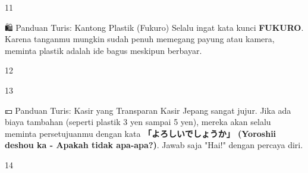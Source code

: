 \begin{convobox}{11}
    \noindent
     

    \vspace{1.5em}
\end{convobox}

\begin{lessonbox}{🛍️ Panduan Turis: Kantong Plastik (Fukuro)}
    Selalu ingat kata kunci \textbf{FUKURO}. Karena tanganmu mungkin sudah penuh memegang payung atau kamera, meminta plastik adalah ide bagus meskipun berbayar.
\end{lessonbox}

\begin{convobox}{12}
    \noindent
      

    \vspace{1.5em}
\end{convobox}

\begin{convobox}{13}
    \noindent

    \vspace{1.5em}
\end{convobox}

\begin{lessonbox}{💴 Panduan Turis: Kasir yang Transparan}
    Kasir Jepang sangat jujur. Jika ada biaya tambahan (seperti plastik 3 yen sampai 5 yen), mereka akan selalu meminta persetujuanmu dengan kata \textbf{「よろしいでしょうか」 (Yoroshii deshou ka - Apakah tidak apa-apa?)}. Jawab saja "Hai!" dengan percaya diri.
\end{lessonbox}

\begin{convobox}{14}
    \noindent

    \vspace{1.5em}
\end{convobox}

